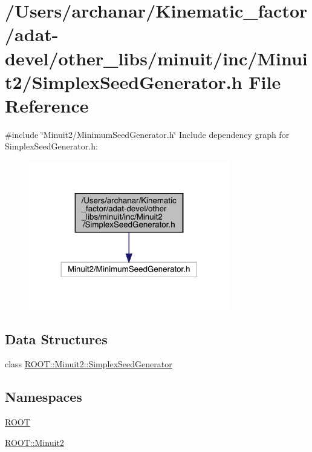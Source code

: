 \hypertarget{adat-devel_2other__libs_2minuit_2inc_2Minuit2_2SimplexSeedGenerator_8h}{}\section{/\+Users/archanar/\+Kinematic\+\_\+factor/adat-\/devel/other\+\_\+libs/minuit/inc/\+Minuit2/\+Simplex\+Seed\+Generator.h File Reference}
\label{adat-devel_2other__libs_2minuit_2inc_2Minuit2_2SimplexSeedGenerator_8h}
{\ttfamily \#include \char`\"{}Minuit2/\+Minimum\+Seed\+Generator.\+h\char`\"{}}\newline
Include dependency graph for Simplex\+Seed\+Generator.\+h\+:
\nopagebreak
\begin{figure}[H]
\begin{center}
\leavevmode
\includegraphics[width=248pt]{d1/d6f/adat-devel_2other__libs_2minuit_2inc_2Minuit2_2SimplexSeedGenerator_8h__incl}
\end{center}
\end{figure}
\subsection*{Data Structures}
\begin{DoxyCompactItemize}
\item 
class \mbox{\hyperlink{classROOT_1_1Minuit2_1_1SimplexSeedGenerator}{R\+O\+O\+T\+::\+Minuit2\+::\+Simplex\+Seed\+Generator}}
\end{DoxyCompactItemize}
\subsection*{Namespaces}
\begin{DoxyCompactItemize}
\item 
 \mbox{\hyperlink{namespaceROOT}{R\+O\+OT}}
\item 
 \mbox{\hyperlink{namespaceROOT_1_1Minuit2}{R\+O\+O\+T\+::\+Minuit2}}
\end{DoxyCompactItemize}
